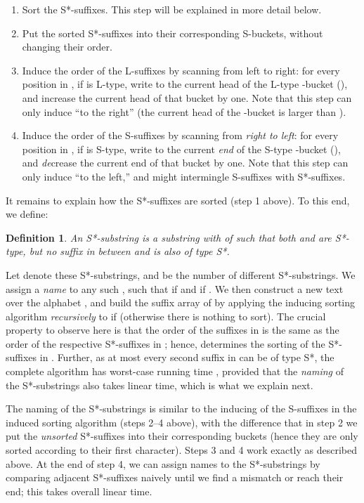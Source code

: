 \documentclass[11pt,onecolumn,final]{article} \usepackage[latin1]{inputenc}
\theoremstyle{plain}
\newtheorem{definition}{Definition}
\theoremstyle{remark}
\begin{document}
\begin{enumerate}
\item Sort the S*-suffixes. This step will be explained in more detail below.
\item Put the sorted S*-suffixes into their corresponding S-buckets, without changing their order.
\item Induce the order of the L-suffixes by scanning  from left to right: for every position  in , if  is L-type, write  to the current head of the L-type -bucket (), and increase the current head of that bucket by one. Note that this step can only induce ``to the right'' (the current head of the -bucket is larger than ).
\item Induce the order of the S-suffixes by scanning  from \emph{right to left}: for every position  in , if  is S-type, write  to the current \emph{end} of the S-type -bucket (), and \emph{de}crease the current end of that bucket by one. Note that this step can only induce ``to the left,'' and might intermingle S-suffixes with S*-suffixes.
\end{enumerate}

It remains to explain how the S*-suffixes are sorted (step 1 above). To this end, we define:

\begin{definition}
  An \emph{S*-substring} is a substring  with  of  such that both  and  are S*-type, but no suffix in between  and  is also of type S*.
\end{definition}

Let  denote these S*-substrings, and  be the number of different S*-substrings. We assign a \emph{name}  to any such , such that  if  and  if . We then construct a new text  over the alphabet , and build the suffix array  of  by applying the inducing sorting algorithm \emph{recursively} to  if  (otherwise there is nothing to sort). The crucial property \cite{nong09linear} to observe here is that the order of the suffixes in  is the same as the order of the respective S*-suffixes in ; hence,  determines the sorting of the S*-suffixes in . Further, as at most every second suffix in  can be of type S*, the complete algorithm has worst-case running time , provided that the \emph{naming} of the S*-substrings also takes linear time, which is what we explain next.

The naming of the S*-substrings is similar to the inducing of the S-suffixes in the induced sorting algorithm (steps 2--4 above), with the difference that in step 2 we put the \emph{unsorted} S*-suffixes into their corresponding buckets (hence they are only sorted according to their first character). Steps 3 and 4 work exactly as described above. At the end of step 4, we can assign names to the S*-substrings by comparing adjacent S*-suffixes naively until we find a mismatch or reach their end; this takes overall linear time.
\end{document}
